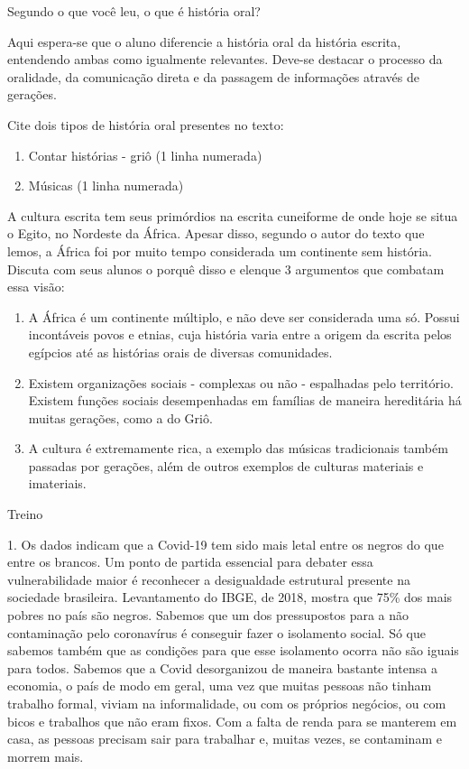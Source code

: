 Segundo o que você leu, o que é história oral?

Aqui espera-se que o aluno diferencie a história oral da história
escrita, entendendo ambas como igualmente relevantes. Deve-se destacar o
processo da oralidade, da comunicação direta e da passagem de
informações através de gerações.

Cite dois tipos de história oral presentes no texto:

\begin{enumerate}
\def\labelenumi{\arabic{enumi}.}
\item
  Contar histórias - griô (1 linha numerada)
\item
  Músicas (1 linha numerada)
\end{enumerate}

A cultura escrita tem seus primórdios na escrita cuneiforme de onde hoje
se situa o Egito, no Nordeste da África. Apesar disso, segundo o autor
do texto que lemos, a África foi por muito tempo considerada um
continente sem história. Discuta com seus alunos o porquê disso e
elenque 3 argumentos que combatam essa visão:

\begin{enumerate}
\def\labelenumi{\arabic{enumi}.}
\item
  A África é um continente múltiplo, e não deve ser considerada uma só.
  Possui incontáveis povos e etnias, cuja história varia entre a origem
  da escrita pelos egípcios até as histórias orais de diversas
  comunidades.
\item
  Existem organizações sociais - complexas ou não - espalhadas pelo
  território. Existem funções sociais desempenhadas em famílias de
  maneira hereditária há muitas gerações, como a do Griô.
\item
  A cultura é extremamente rica, a exemplo das músicas tradicionais
  também passadas por gerações, além de outros exemplos de culturas
  materiais e imateriais.
\end{enumerate}

Treino

1. Os dados indicam que a Covid-19 tem sido mais letal entre os negros
do que entre os brancos. Um ponto de partida essencial para debater essa
vulnerabilidade maior é reconhecer a desigualdade estrutural presente na
sociedade brasileira. Levantamento do IBGE, de 2018, mostra que 75\% dos
mais pobres no país são negros. Sabemos que um dos pressupostos para a
não contaminação pelo coronavírus é conseguir fazer o isolamento social.
Só que sabemos também que as condições para que esse isolamento ocorra
não são iguais para todos. Sabemos que a Covid desorganizou de maneira
bastante intensa a economia, o país de modo em geral, uma vez que muitas
pessoas não tinham trabalho formal, viviam na informalidade, ou com os
próprios negócios, ou com bicos e trabalhos que não eram fixos. Com a
falta de renda para se manterem em casa, as pessoas precisam sair para
trabalhar e, muitas vezes, se contaminam e morrem mais.

